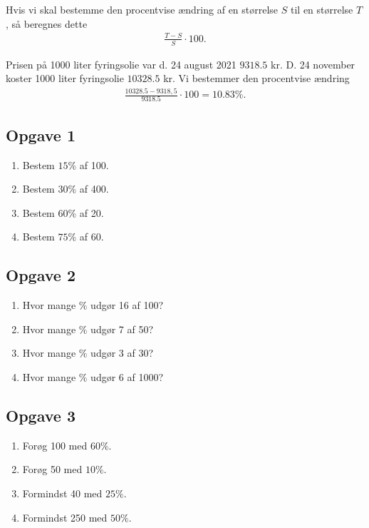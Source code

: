 \begin{regel}[Procentregneregel 4]
Hvis vi skal bestemme den procentvise ændring af en størrelse $S$ til en størrelse $T$, så beregnes dette 
\begin{align*}
\frac{T-S}{S}\cdot 100.
\end{align*}
\end{regel}
\begin{exa}
Prisen på 1000 liter fyringsolie var d. 24 august 2021 $9318.5$ kr. D. 24 november koster 1000 liter fyringsolie $10328.5$ kr. Vi bestemmer den procentvise ændring
\begin{align*}
\frac{10328.5-9318,5}{9318.5}\cdot 100 = 10.83\%. 
\end{align*}
\end{exa}

\subsection*{Opgave 1}

\begin{enumerate}[label=\roman*)]
	\item Bestem $15\%$ af 100.
	\item Bestem $30\%$ af 400.
	\item Bestem $60\%$ af 20.
	\item Bestem $75\%$ af 60.
\end{enumerate}

\subsection*{Opgave 2}

\begin{enumerate}[label=\roman*)]
	\item Hvor mange $\% $ udgør 16 af 100?
	\item Hvor mange $\% $ udgør 7 af 50?
	\item Hvor mange $\% $ udgør 3 af 30?
	\item Hvor mange $\% $ udgør 6 af 1000?
\end{enumerate}

\subsection*{Opgave 3}

\begin{enumerate}[label=\roman*)]
	\item Forøg 100 med $60\%$.
	\item Forøg 50 med $10\%$.
	\item Formindst 40 med $25\%$.
	\item Formindst 250 med $50\%$.
\end{enumerate}

